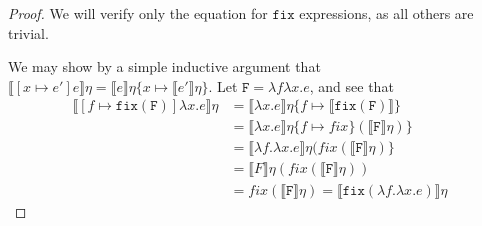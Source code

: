 \begin{proof}
 We will verify only the equation for $\texttt{fix}$ expressions, as all others are trivial.

We may show by a simple inductive argument that 
$\llbracket [x \mapsto e']e\rrbracket\eta = \llbracket e \rrbracket\eta\{x \mapsto \llbracket e' \rrbracket\eta\}$.
Let $\texttt{F} = \lambda f \lambda x.e$, and see that
\begin{align*}
\llbracket [f \mapsto \texttt{fix}(\texttt{F})]\lambda x.e\rrbracket\eta 
&= \llbracket \lambda x.e\rrbracket\eta\{f \mapsto \llbracket \texttt{fix}(\texttt{F})\rrbracket\} \\
&=\llbracket \lambda x.e\rrbracket\eta\{f \mapsto fix\}(\llbracket \texttt{F} \rrbracket\eta)\} \\
&= \llbracket \lambda f.\lambda x.e \rrbracket\eta(fix(\llbracket \texttt{F}\rrbracket\eta)\} \\
&= \llbracket F \rrbracket\eta(fix(\llbracket \texttt{F}\rrbracket\eta)) \\ 
&= fix(\llbracket \texttt{F}\rrbracket\eta) =  \llbracket \texttt{fix}(\lambda f. \lambda x.e)\rrbracket \eta
\end{align*}
\end{proof}
 
